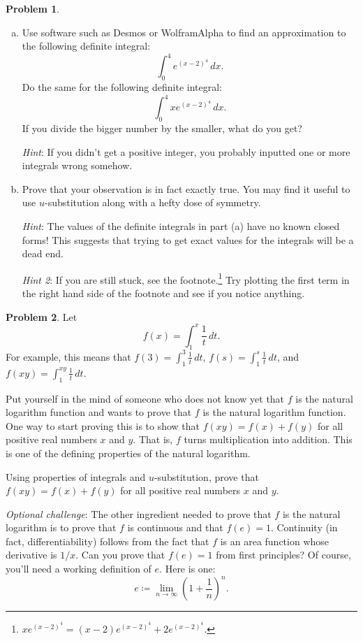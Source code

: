 \documentclass[11pt,oneside]{amsart}
\theoremstyle{definition}
\newtheorem{problem}{Problem}
\begin{document}
    \begin{problem}
        \leavevmode
        \begin{enumerate}[(a)]
            \item Use software such as Desmos or WolframAlpha to find an approximation to the following definite integral:
            \[\int_0^4e^{(x-2)^4}\,dx.\]
            Do the same for the following definite integral:
            \[\int_0^4 xe^{(x-2)^4}\,dx.\]
            If you divide the bigger number by the smaller, what do you get?

            \emph{Hint}: If you didn't get a positive integer, you probably inputted one or more integrals wrong somehow.
            \item Prove that your observation is in fact exactly true. You may find it useful to use $u$-substitution along with a hefty dose of symmetry.
            
            \emph{Hint}: The values of the definite integrals in part (a) have no known closed forms! This suggests that trying to get exact values for the integrals will be a dead end.

            \emph{Hint 2}: If you are still stuck, see the footnote.\footnote{$xe^{(x-2)^4}=(x-2)e^{(x-2)^4}+2e^{(x-2)^4}$.} Try plotting the first term in the right hand side of the footnote and see if you notice anything.
        \end{enumerate}
    \end{problem}

    \begin{problem}
        Let
        \[f(x)=\int_1^x\frac 1t\,dt.\]
        For example, this means that $f(3)=\int_1^3\frac 1t\,dt$, $f(s)=\int_1^s\frac 1t\,dt$, and $f(xy)=\int_1^{xy}\frac 1t\,dt$.

        Put yourself in the mind of someone who does not know yet that $f$ is the natural logarithm function and wants to prove that $f$ is the natural logarithm function. One way to start proving this is to show that $f(xy)=f(x)+f(y)$ for all positive real numbers $x$ and $y$. That is, $f$ turns multiplication into addition. This is one of the defining properties of the natural logarithm.
        
        Using properties of integrals and $u$-substitution, prove that $f(xy)=f(x)+f(y)$ for all positive real numbers $x$ and $y$.

        \emph{Optional challenge}: The other ingredient needed to prove that $f$ is the natural logarithm is to prove that $f$ is continuous and that $f(e)=1$. Continuity (in fact, differentiability) follows from the fact that $f$ is an area function whose derivative is $1/x$. Can you prove that $f(e)=1$ from first principles? Of course, you'll need a working definition of $e$. Here is one:
        \[e\coloneqq\lim_{n\to\infty}\left(1+\frac 1n\right)^n.\]
    \end{problem}
\end{document}
